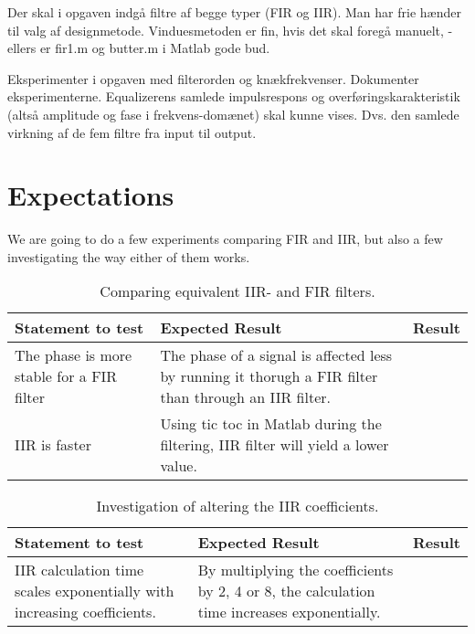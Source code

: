 Der skal i opgaven indgå filtre af begge typer (FIR og IIR). Man har frie hænder til valg af designmetode. Vinduesmetoden er fin, hvis det skal foregå manuelt, - ellers er fir1.m og butter.m i Matlab gode bud.

Eksperimenter i opgaven med filterorden og knækfrekvenser. Dokumenter eksperimenterne. Equalizerens samlede impulsrespons og overføringskarakteristik (altså amplitude og fase i frekvens-domænet) skal kunne vises. Dvs. den samlede virkning af de fem filtre fra input til output.

\section{Expectations}
\label{sec:expectations}
We are going to do a few experiments comparing FIR and IIR, but also a few investigating the way either of them works.

\begin{table}
	\caption{Comparing equivalent IIR- and FIR filters.}
	\label{tab:IIRvsFIR}
	\begin{tabularx}{\textwidth}{X X X}
		Statement to test	& Expected Result	& Result \\
		\toprule
		The phase is more stable for a FIR filter & The phase of a signal is affected less by running it thorugh a FIR filter than through an IIR filter. & \\
		IIR is faster		& Using tic toc in Matlab during the filtering, IIR filter will yield a lower value. & \\
	\end{tabularx}
\end{table}

\begin{table}
	\caption{Investigation of altering the IIR coefficients.}
	\label{tab:IIRtest}
	\begin{tabularx}{\textwidth}{X X X}
		Statement to test	& Expected Result	& Result \\
		\toprule
		IIR calculation time scales exponentially with increasing coefficients. & By multiplying the coefficients by 2, 4 or 8, the calculation time increases exponentially. & \\
	\end{tabularx}
\end{table}